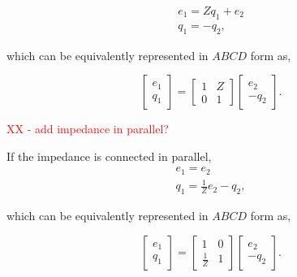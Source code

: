 \documentclass[lettersize,journal]{IEEEtran}
\newcommand{\rc}[1]{\textcolor{red}{#1}}
\begin{document}
\begin{subequations}
        \begin{align}
                e_1 = Zq_1 + e_2 \\
                q_1 = -q_2 ,
        \end{align}
        \label{eq:impedance_eom}
\end{subequations}

\noindent{} which can be equivalently represented in $ABCD$ form as,

\begin{equation}
        \begin{bmatrix}
                e_1 \\ q_1
        \end{bmatrix}
        =
        \begin{bmatrix}
                1 & Z \\ 0 & 1
        \end{bmatrix}
        \begin{bmatrix}
                e_2 \\ - q_2
        \end{bmatrix} .
        \label{eq:impedance_abcd}
\end{equation}

\noindent{}\rc{XX - add impedance in parallel?}

If the impedance is connected in parallel,
\begin{subequations}
        \begin{align}
                e_1 =  e_2 \\
                q_1 = \frac{1}{Z} e_2 - q_2 ,
        \end{align}
        \label{eq:parallel_impedance_eom}
\end{subequations}

\noindent{} which can be equivalently represented in $ABCD$ form as,

\begin{equation}
        \begin{bmatrix}
                e_1 \\ q_1
        \end{bmatrix}
        =
        \begin{bmatrix}
                1 & 0 \\ \frac{1}{Z} & 1
        \end{bmatrix}
        \begin{bmatrix}
                e_2 \\ - q_2
        \end{bmatrix} .
        \label{eq:parallel_impedance_abcd}
\end{equation}
\end{document}
